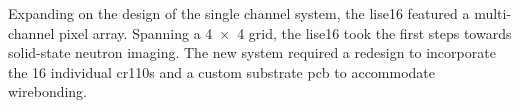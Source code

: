 \documentclass[../../../main.tex]{subfiles}
\begin{document}
%
    \Xsubsection%
    Expanding on the design of the single channel system, the \gls{lise16} featured a multi-channel pixel array.
    Spanning a \num{4x4} grid, the \gls{lise16} took the first steps towards \gls{solid-state} neutron imaging.
    The new system required a redesign to incorporate the 16 individual \glspl{cr110} and a custom substrate \gls{pcb} to accommodate wirebonding.
\end{document}
